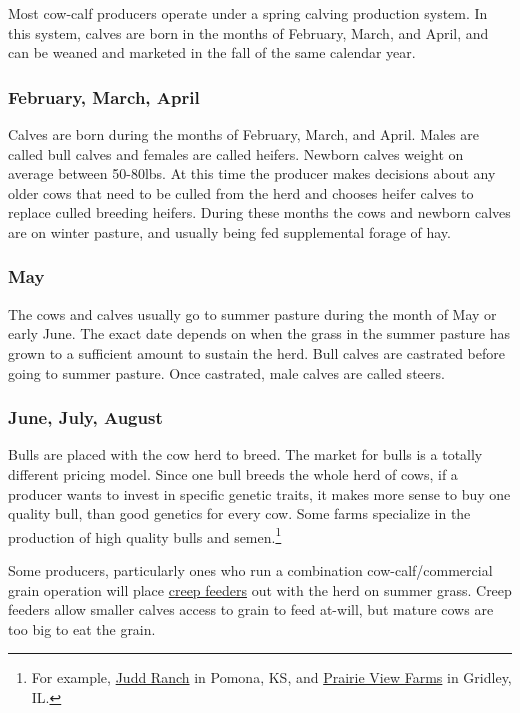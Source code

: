 \documentclass[]{book}
\let\rmarkdownfootnote\footnote%
\def\footnote{\protect\rmarkdownfootnote}
\theoremstyle{definition}
\theoremstyle{definition}
\theoremstyle{remark}
\begin{document}
Most cow-calf producers operate under a spring calving production
system. In this system, calves are born in the months of February,
March, and April, and can be weaned and marketed in the fall of the same
calendar year.

\subsubsection{February, March, April}\label{february-march-april}

Calves are born during the months of February, March, and April. Males
are called bull calves and females are called heifers. Newborn calves
weight on average between 50-80lbs. At this time the producer makes
decisions about any older cows that need to be culled from the herd and
chooses heifer calves to replace culled breeding heifers. During these
months the cows and newborn calves are on winter pasture, and usually
being fed supplemental forage of hay.

\subsubsection{May}\label{may}

The cows and calves usually go to summer pasture during the month of May
or early June. The exact date depends on when the grass in the summer
pasture has grown to a sufficient amount to sustain the herd. Bull
calves are castrated before going to summer pasture. Once castrated,
male calves are called steers.

\subsubsection{June, July, August}\label{june-july-august}

Bulls are placed with the cow herd to breed. The market for bulls is a
totally different pricing model. Since one bull breeds the whole herd of
cows, if a producer wants to invest in specific genetic traits, it makes
more sense to buy one quality bull, than good genetics for every cow.
Some farms specialize in the production of high quality bulls and
semen.\footnote{For example, \href{http://www.juddranch.com/}{Judd
  Ranch} in Pomona, KS, and \href{http://www.pvfangus.com/}{Prairie View
  Farms} in Gridley, IL.}

Some producers, particularly ones who run a combination
cow-calf/commercial grain operation will place
\href{https://www.google.com/search?q=creep+feeder\&espv=2\&biw=1920\&bih=1075\&source=lnms\&tbm=isch\&sa=X\&ved=0CAcQ_AUoAmoVChMI18ne2paTyQIVSJUeCh3eMw5X}{creep
feeders} out with the herd on summer grass. Creep feeders allow smaller
calves access to grain to feed at-will, but mature cows are too big to
eat the grain.
\end{document}
